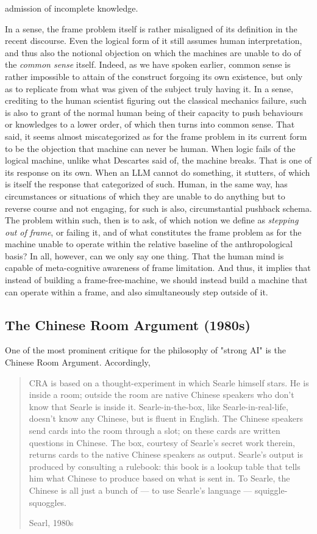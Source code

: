 admission of incomplete knowledge. 

In a sense, the frame problem itself is rather misaligned of its definition in the recent discourse. Even the logical form of it still assumes human interpretation, and thus also the notional objection on which the machines are unable to do of the \textit{common sense} itself. Indeed, as we have spoken earlier, common sense is rather impossible to attain of the construct forgoing its own existence, but only as to replicate from what was given of the subject truly having it. In a sense, crediting to the human scientist figuring out the classical mechanics failure, such is also to grant of the normal human being of their capacity to push behaviours or knowledges to a lower order, of which then turns into common sense. That said, it seems almost miscategorized as for the frame problem in its current form to be the objection that machine can never be human. When logic fails of the logical machine, unlike what Descartes said of, the machine breaks. That is one of its response on its own. When an LLM cannot do something, it stutters, of which is itself the response that categorized of such. Human, in the same way, has circumstances or situations of which they are unable to do anything but to reverse course and not engaging, for such is also, circumstantial pushback schema. The problem within such, then is to ask, of which notion we define as \textit{stepping out of frame}, or failing it, and of what constitutes the frame problem as for the machine unable to operate within the relative baseline of the anthropological basis? In all, however, can we only say one thing. That the human mind is capable of meta-cognitive awareness of frame limitation. And thus, it implies that instead of building a frame-free-machine, we should instead build a machine that can operate within a frame, and also simultaneously step outside of it. 

\subsection{The Chinese Room Argument (1980s)}
One of the most prominent critique for the philosophy of "strong AI" is the Chinese Room Argument. Accordingly,

\blockquote[Searl, 1980s]{CRA is based on a thought-experiment in which Searle himself stars. He is inside a room; outside the room are native Chinese speakers who don't know that Searle is inside it. Searle-in-the-box, like Searle-in-real-life, doesn't know any Chinese, but is fluent in English. The Chinese speakers send cards into the room through a slot; on these cards are written questions in Chinese. The box, courtesy of Searle's secret work therein, returns cards to the native Chinese speakers as output. Searle's output is produced by consulting a rulebook: this book is a lookup table that tells him what Chinese to produce based on what is sent in. To Searle, the Chinese is all just a bunch of --- to use Searle's language --- squiggle-squoggles.}

